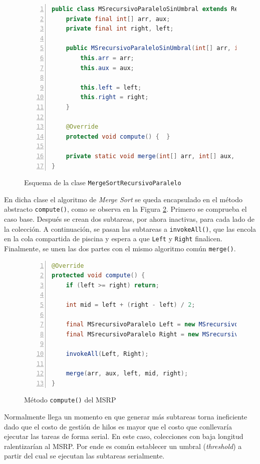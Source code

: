 \documentclass[titlepage]{article}
\begin{document}
\begin{figure}[h]
	\begin{lstlisting}[language=java, frame=single, numbers=left]
public class MSrecursivoParaleloSinUmbral extends RecursiveAction {
	private final int[] arr, aux;
	private final int right, left;
	
	public MSrecursivoParaleloSinUmbral(int[] arr, int[] aux, int left, int right) {
		this.arr = arr;
		this.aux = aux;
		
		this.left = left;
		this.right = right;
	}
	
	@Override
	protected void compute() {	}
	
	private static void merge(int[] arr, int[] aux, int left, int mid, int right) {	}	
}    	
	\end{lstlisting}
	\caption{Esquema de la clase \lstinline{MergeSortRecursivoParalelo}}
	\label{fig:MSRP_RecursiveAction}
\end{figure}

En dicha clase el algoritmo de \textit{Merge Sort} se queda encapsulado en el método abstracto \lstinline|compute()|, como se observa en la Figura \ref{fig:MSRP_Compute}. Primero se comprueba el caso base. Después se crean dos subtareas, por ahora inactivas, para cada lado de la colección. A continuación, se pasan las subtareas a \lstinline|invokeAll()|, que las encola en la cola compartida de piscina y espera a que \lstinline|Left| y \lstinline|Right| finalicen. Finalmente, se unen las dos partes con el mismo algoritmo común \lstinline|merge()|.

\begin{figure}[h]
    \begin{lstlisting}[language=java, frame=single, numbers=left]
@Override
protected void compute() {
	if (left >= right) return;
	
	int mid = left + (right - left) / 2;
	
	final MSrecursivoParalelo Left = new MSrecursivoParalelo(arr, aux, left, mid);
	final MSrecursivoParalelo Right = new MSrecursivoParalelo(arr, aux, mid + 1, right);
	
	invokeAll(Left, Right);
	
	merge(arr, aux, left, mid, right);
}
    \end{lstlisting}
    \caption{Método \lstinline{compute()} del MSRP}
    \label{fig:MSRP_Compute}
\end{figure}

Normalmente llega un momento en que generar más subtareas torna ineficiente dado que el costo de gestión de hilos es mayor que el costo que conllevaría ejecutar las tareas de forma serial. En este caso, colecciones con baja longitud ralentizarían al MSRP. Por ende es común establecer un umbral (\textit{threshold}) a partir del cual se ejecutan las subtareas serialmente.
\end{document}
